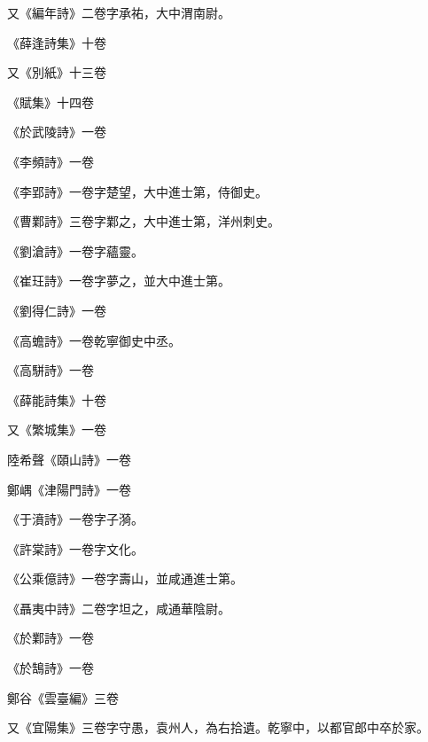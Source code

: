 \begin{pinyinscope}
 又《編年詩》二卷字承祐，大中渭南尉。



 《薛逢詩集》十卷



 又《別紙》十三卷



 《賦集》十四卷



 《於武陵詩》一卷



 《李頻詩》一卷



 《李郢詩》一卷字楚望，大中進士第，侍御史。



 《曹鄴詩》三卷字鄴之，大中進士第，洋州刺史。



 《劉滄詩》一卷字蘊靈。



 《崔玨詩》一卷字夢之，並大中進士第。



 《劉得仁詩》一卷



 《高蟾詩》一卷乾寧御史中丞。



 《高駢詩》一卷



 《薛能詩集》十卷



 又《繁城集》一卷



 陸希聲《頤山詩》一卷



 鄭嵎《津陽門詩》一卷



 《于濆詩》一卷字子漪。



 《許棠詩》一卷字文化。



 《公乘億詩》一卷字壽山，並咸通進士第。



 《聶夷中詩》二卷字坦之，咸通華陰尉。



 《於鄴詩》一卷



 《於鵠詩》一卷



 鄭谷《雲臺編》三卷



 又《宜陽集》三卷字守愚，袁州人，為右拾遺。乾寧中，以都官郎中卒於家。




\end{pinyinscope}
